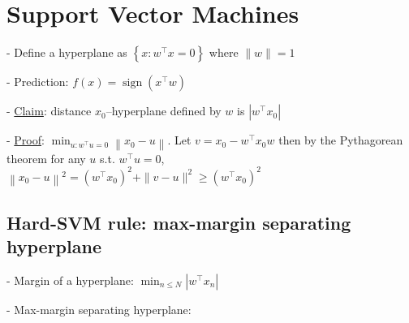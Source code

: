 \section{Support Vector Machines}





- Define a hyperplane as $\left\{x: w^{\top} x=0\right\}$ where $\|w\|=1$

- Prediction:
$
f(x)=\operatorname{sign}\left(x^{\top} w\right)
$

- \underline{Claim}: distance $x_{0}$--hyperplane defined by $w$ is $\left|w^{\top} x_{0}\right|$

- \underline{Proof}: $\min _{u: w^{\top} u=0}\left\|x_{0}-u\right\|$. 
Let $v=x_{0}-w^{\top} x_{0} w$ then by the Pythagorean theorem for any $u$ s.t. $w^{\top} u=0$,
$\left\|x_{0}-u\right\|^{2}=\left(w^{\top} x_{0}\right)^{2}+\|v-u\|^{2} \geq\left(w^{\top} x_{0}\right)^{2}$

\subsection*{Hard-SVM rule: max-margin separating hyperplane}



- Margin of a hyperplane: $\min _{n \leq N}\left|w^{\top} x_{n}\right|$

- Max-margin separating hyperplane:

